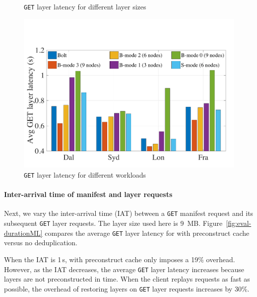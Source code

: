 \begin{figure}[t]
\begin{minipage}{0.3\textwidth}
		\caption{\texttt{GET} layer latency for different layer sizes}
		\label{fig:eval-dalprimary}
	\end{minipage}%
	\hspace{1mm}
	\begin{minipage}{0.3\textwidth}
		\centering
		\includegraphics[width=1.0\textwidth]{graphs/total-traces.pdf}
		\caption{\texttt{GET} layer latency for different workloads} %
		\label{fig:eval-total-traces}
	\end{minipage}
\end{figure}
 
\paragraph{Inter-arrival time of manifest and layer requests}
%
Next, we vary the inter-arrival time (IAT) between a \texttt{GET} manifest request and its
subsequent \texttt{GET} layer requests.
%
The layer size used here is 9~MB.
%
Figure~\ref{fig:eval-durationML} compares the average \texttt{GET} layer latency for
\sysname with preconstruct cache versus no deduplication.

When the IAT is 1\,s, \sysname with preconstruct cache only imposes a 19\% overhead.
%
However, as the IAT decreases, the average \texttt{GET} layer latency increases because
layers are not preconstructed in time.
%
When the client replays requests as fast as possible, the overhead of restoring layers on
\texttt{GET} layer requests increases by 30\%.
%

